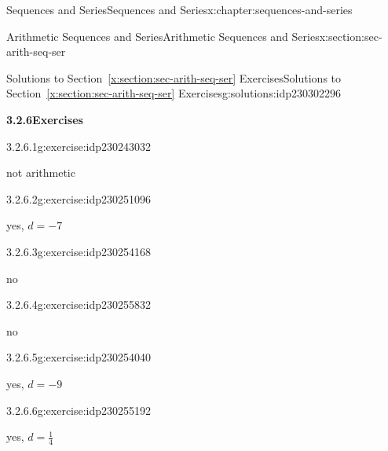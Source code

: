 \documentclass[twoside,10pt,]{book}
\newcommand{\xreffont}{\relax}
\numberwithin{equation}{section}
\begin{document}
\begin{chapterptx}{Sequences and Series}{}{Sequences and Series}{}{}{x:chapter:sequences-and-series}
\begin{sectionptx}{Arithmetic Sequences and Series}{}{Arithmetic Sequences and Series}{}{}{x:section:sec-arith-seq-ser}
\typeout{************************************************}
%
\begin{solutions-subsection}{Solutions to Section~{\xreffont\ref*{x:section:sec-arith-seq-ser}} Exercises}{}{Solutions to Section~{\xreffont\ref*{x:section:sec-arith-seq-ser}} Exercises}{}{}{g:solutions:idp230302296}
\par\medskip
\noindent\textbf{\normalsize{}3.2.6\space\textperiodcentered\space{}Exercises}
\begin{exercisegroup}
\begin{divisionsolutioneg}{3.2.6.1}{}{g:exercise:idp230243032}%
\par\smallskip%
\noindent\hypertarget{g:solution:idp230244824-main}{}not arithmetic\end{divisionsolutioneg}%
\begin{divisionsolutioneg}{3.2.6.2}{}{g:exercise:idp230251096}%
\par\smallskip%
\noindent\hypertarget{g:solution:idp230258264-main}{}yes, \(d=-7\)\end{divisionsolutioneg}%
\begin{divisionsolutioneg}{3.2.6.3}{}{g:exercise:idp230254168}%
\par\smallskip%
\noindent\hypertarget{g:solution:idp230256600-main}{}no\end{divisionsolutioneg}%
\begin{divisionsolutioneg}{3.2.6.4}{}{g:exercise:idp230255832}%
\par\smallskip%
\noindent\hypertarget{g:solution:idp230252760-main}{}no\end{divisionsolutioneg}%
\begin{divisionsolutioneg}{3.2.6.5}{}{g:exercise:idp230254040}%
\par\smallskip%
\noindent\hypertarget{g:solution:idp230256728-main}{}yes, \(d=-9\)\end{divisionsolutioneg}%
\begin{divisionsolutioneg}{3.2.6.6}{}{g:exercise:idp230255192}%
\par\smallskip%
\noindent\hypertarget{g:solution:idp230258392-main}{}yes, \(d=\frac{1}{4}\)\end{divisionsolutioneg}%
\end{exercisegroup}
\par\medskip\noindent
\begin{exercisegroup}
\end{exercisegroup}
\end{solutions-subsection}
\end{sectionptx}
\end{chapterptx}
\end{document}
